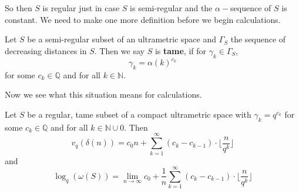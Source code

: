 
So then $S$ is regular just in case $S$ is semi-regular and the $\alpha-$sequence of $S$ is constant. We need to make one more definition before we begin calculations. \\

\begin{definition}
Let $S$ be a semi-regular subset of an ultrametric space and $\Gamma_S$ the sequence of decreasing distances in $S$. Then we say $S$ is \textbf{tame}, if for $\gamma_k \in \Gamma_S$, \[\gamma_k = \alpha(k)^{c_k}\] for some $c_k \in \mathbb{Q}$ and for all $k \in \mathbb{N}$.
\end{definition}

Now we see what this situation means for calculations.\\

\begin{proposition}
	Let $S$ be a regular, tame subset of a compact ultrametric space with $\gamma_k = q^{c_k}$ for some $c_k \in \mathbb{Q}$ and for all $k \in \mathbb{N} \cup 0$. Then 
	\[v_{q}(\delta(n)) =  c_0n + \sum_{k=1}^{\infty} (c_{k} - c_{k-1}) \cdot \lfloor\frac{n}{q^{k}}\rfloor \]
	 and 
	\[\log_q(\omega(S)) = \lim_{n\to\infty} c_0 + \frac{1}{n}\sum_{k=1}^{\infty} (c_{k} - c_{k-1}) \cdot \lfloor\frac{n}{q^{k}}\rfloor  \]
\end{proposition}

